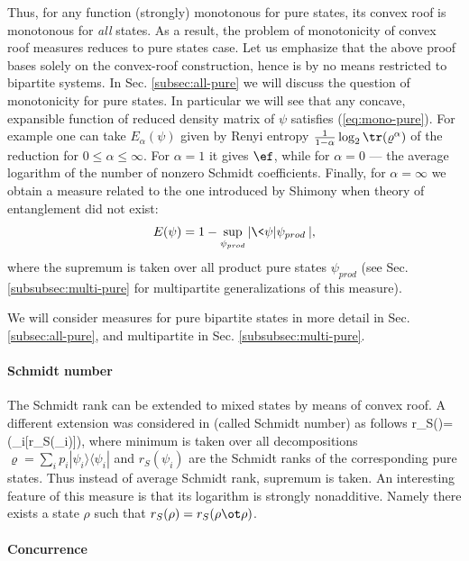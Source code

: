\documentclass[twocolumn,aps,rmp]{revtex4}
\begin{document}
Thus, for any function (strongly) monotonous for pure states, its
convex roof is monotonous for {\it all} states. As a result, the
problem of monotonicity of convex roof measures reduces to pure
states case. Let us emphasize that the above proof bases solely on
the convex-roof construction, hence is by no means restricted to
bipartite systems. In Sec. \ref{subsec:all-pure} we will discuss the
question of monotonicity  for pure states. In particular we will see
that any concave, expansible function of reduced density matrix of
$\psi$ satisfies (\ref{eq:mono-pure}). For example
\cite{Vidal-mon2000} one can take $E_\alpha(\psi)$ given by Renyi
entropy ${1\over 1-\alpha}\log_2\tr (\varrho^\alpha)$ of the
reduction for $0\leq \alpha \leq \infty$. For $\alpha=1$ it  gives
$\ef$, while for $\alpha=0$ --- the average logarithm of the
number of nonzero Schmidt coefficients. Finally, for
$\alpha=\infty$ we obtain a measure related to the one introduced by
Shimony \cite{Shimony1995-miara} when theory of entanglement did not
exist: \begin{equation} E(\psi)= 1 - \sup_{\psi_{prod}}|\<\psi|\psi_{prod}\>|, \end{equation}
where the supremum is taken over all product pure states
$\psi_{prod}$ (see Sec. \ref{subsubsec:multi-pure} for multipartite
generalizations of this measure).




We will consider measures for pure bipartite states
in more detail  in Sec. \ref{subsec:all-pure}, and multipartite
in Sec. \ref{subsubsec:multi-pure}.

\paragraph{Schmidt number}
The Schmidt rank can be extended to mixed states by means of convex
roof. A different extension was considered in
\cite{Terhal-Pawel-rank,SchmidtWitn} (called Schmidt number) as follows
\be
r_{S}(\varrho)= \min(\max_{i}[r_{S}(\psi_{i})]),
\ee
where minimum is
taken over all decompositions $\varrho=\sum_{i}p_{i}|\psi_{i}\rangle
\langle \psi_{i}|$ and $r_{S}(\psi_{i})$ are the Schmidt ranks of
the corresponding pure states. Thus instead of average Schmidt rank,
supremum is taken. An interesting feature of this measure is that
its logarithm is strongly nonadditive. Namely there exists a state
$\rho$ such that $r_S(\rho)=r_S(\rho\ot \rho)$.

\paragraph{Concurrence}
\label{par:concurrence}
\end{document}
